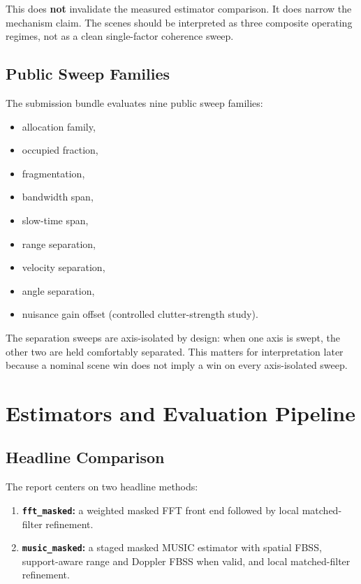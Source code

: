 \documentclass[11pt]{article}
\newcommand{\fft}{\texttt{fft\_masked}}
\newcommand{\music}{\texttt{music\_masked}}
\begin{document}
This does \textbf{not} invalidate the measured estimator comparison. It does narrow the mechanism claim. The scenes should be interpreted as three composite operating regimes, not as a clean single-factor coherence sweep.

\subsection{Public Sweep Families}

The submission bundle evaluates nine public sweep families:
\begin{itemize}
  \item allocation family,
  \item occupied fraction,
  \item fragmentation,
  \item bandwidth span,
  \item slow-time span,
  \item range separation,
  \item velocity separation,
  \item angle separation,
  \item nuisance gain offset (controlled clutter-strength study).
\end{itemize}

The separation sweeps are axis-isolated by design: when one axis is swept, the other two are held comfortably separated. This matters for interpretation later because a nominal scene win does not imply a win on every axis-isolated sweep.

\section{Estimators and Evaluation Pipeline}

\subsection{Headline Comparison}

The report centers on two headline methods:
\begin{enumerate}
  \item \textbf{\fft:} a weighted masked FFT front end followed by local matched-filter refinement.
  \item \textbf{\music:} a staged masked MUSIC estimator with spatial FBSS, support-aware range and Doppler FBSS when valid, and local matched-filter refinement.
\end{enumerate}
\end{document}

